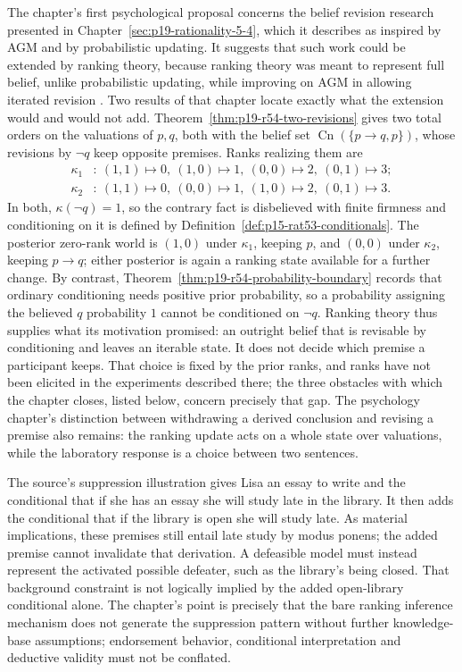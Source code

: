 The chapter's first psychological proposal concerns the belief revision
research presented in Chapter~\ref{sec:p19-rationality-5-4}, which it describes
as inspired by AGM and by probabilistic updating.  It suggests that such work
could be extended by ranking theory, because ranking theory was meant to
represent full belief, unlike probabilistic updating, while improving on AGM
in allowing iterated revision
\parencite[p.~342]{KernIsbernerSkovgaardOlsenSpohn2021Ranking}.
Two results of that chapter locate exactly what the extension would and would
not add.  Theorem~\ref{thm:p19-r54-two-revisions} gives two total orders on
the valuations of \(p,q\), both with the belief set
\(\operatorname{Cn}(\{p\to q,p\})\), whose revisions by \(\neg q\) keep
opposite premises.  Ranks realizing them are
\[
\begin{aligned}
 \kappa_1&:\ (1,1)\mapsto0,\ (1,0)\mapsto1,\ (0,0)\mapsto2,\ (0,1)\mapsto3;\\
 \kappa_2&:\ (1,1)\mapsto0,\ (0,0)\mapsto1,\ (1,0)\mapsto2,\ (0,1)\mapsto3.
\end{aligned}
\]
In both, \(\kappa(\neg q)=1\), so the contrary fact is disbelieved with
finite firmness and conditioning on it is defined by
Definition~\ref{def:p15-rat53-conditionals}.  The posterior zero-rank world is
\((1,0)\) under \(\kappa_1\), keeping \(p\), and \((0,0)\) under
\(\kappa_2\), keeping \(p\to q\); either posterior is again a ranking state
available for a further change.  By contrast,
Theorem~\ref{thm:p19-r54-probability-boundary} records that ordinary
conditioning needs positive prior probability, so a probability assigning the
believed \(q\) probability \(1\) cannot be conditioned on \(\neg q\).  Ranking
theory thus supplies what its motivation promised: an outright belief that is
revisable by conditioning and leaves an iterable state.  It does not decide
which premise a participant keeps.  That choice is fixed by the prior ranks,
and ranks have not been elicited in the experiments described there; the
three obstacles with which the chapter closes, listed below, concern
precisely that gap.  The
psychology chapter's distinction between withdrawing a derived conclusion
and revising a premise also remains: the ranking update acts on a whole
state over valuations, while the laboratory response is a choice between
two sentences.

The source's suppression illustration gives Lisa an essay to write and the
conditional that if she has an essay she will study late in the library.
It then adds the conditional that if the library is open she will study late.
As material implications, these premises still entail late study by modus
ponens; the added premise cannot invalidate that derivation.  A defeasible
model must instead represent the activated possible defeater, such as the
library's being closed.  That background constraint is not logically implied
by the added open-library conditional alone.  The chapter's point is precisely
that the bare ranking inference mechanism does not generate the suppression
pattern without further knowledge-base assumptions; endorsement behavior,
conditional interpretation and deductive validity must not be conflated.

